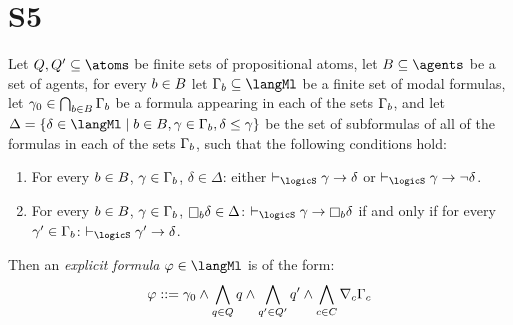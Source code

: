 \section{S5}

\begin{definition}
Let $\atomsQ, \atomsQ' \subseteq \atoms$ be finite sets of propositional atoms,
let $\agentsB \subseteq \agents$ be a set of agents,
for every $b \in B$ let $\Gamma_\agentB \subseteq \langMl$ be a finite set of modal formulas,
let $\gamma_0 \in \bigcap_{b \in B} \Gamma_b$ be a formula appearing in each of the sets $\Gamma_b$, and
let $\Delta = \{\delta \in \langMl \mid \agentB \in \agentsB, \gamma \in \Gamma_\agentB, \delta \leq \gamma\}$ be the set of subformulas of all of the formulas in each of the sets $\Gamma_b$,
such that the following conditions hold:
\begin{enumerate}
    \item For every $b \in B$, $\gamma \in \Gamma_b$, $\delta \in \Delta$: either $\proves_\logicS \gamma \implies \delta$ or $\proves_\logicS \gamma \implies \lnot \delta$.
    \item For every $b \in B$, $\gamma \in \Gamma_b$, $\necessaryB \delta \in \Delta$: $\proves_\logicS \gamma \implies \necessaryB \delta$ if and only if for every $\gamma' \in \Gamma_b$: $\proves_\logicS \gamma' \implies \delta$.
\end{enumerate}
Then an {\em explicit formula} $\phi \in \langMl$ is of the form:
$$
\varphi ::= \gamma_0 \land \bigwedge_{q \in Q} q \land \bigwedge_{q' \in Q'} q' \land \bigwedge_{c \in C} \nabla_{c} \Gamma_c
$$
\end{definition}

